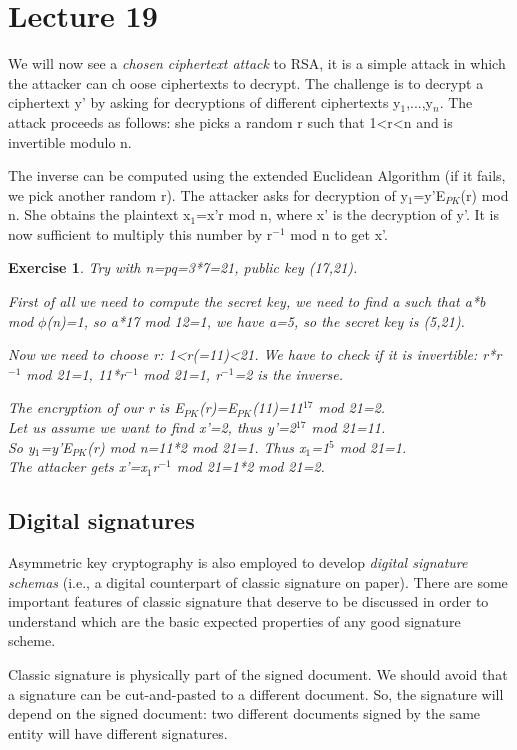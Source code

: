 \documentclass[a4paper, 12pt]{report}
\newtheorem{exercise}{\textbf{Exercise}}
\begin{document}
\chapter*{Lecture 19}
We will now see a \textit{chosen ciphertext attack} to RSA, it is a simple attack in which the attacker can ch	oose ciphertexts to decrypt. The challenge is to decrypt a ciphertext y' by asking for decryptions of different ciphertexts y$_1$,...,y$_n$. The attack proceeds as follows: she picks a random r such that 1<r<n and is invertible modulo n.

The inverse can be computed using the extended Euclidean Algorithm (if it fails, we pick another random r). The attacker asks for decryption of y$_1$=y'E$_{PK}$(r) mod n. She obtains the plaintext x$_1$=x'r mod n, where x' is the decryption of y'. It is now sufficient to multiply this number by r$^{-1}$ mod n to get x'.

\begin{exercise}
	Try with n=pq=3*7=21, public key (17,21).
	
	First of all we need to compute the secret key, we need to find a such that a*b mod $\phi$(n)=1, so a*17 mod 12=1, we have a=5, so the secret key is (5,21).
	
	Now we need to choose r: 1<r(=11)<21. We have to check if it is invertible: r*r$^{-1}$ mod 21=1, 11*r$^{-1}$ mod 21=1, r$^{-1}$=2 is the inverse.
	
	The encryption of our r is E$_{PK}$(r)=E$_{PK}$(11)=11$^{17}$ mod 21=2.\\
	Let us assume we want to find x'=2, thus y'=2$^{17}$ mod 21=11.\\
	So y$_1$=y'E$_{PK}$(r) mod n=11*2 mod 21=1. Thus x$_1$=1$^5$ mod 21=1.\\
	The attacker gets x'=x$_1$r$^{-1}$ mod 21=1*2 mod 21=2.
\end{exercise}

\section*{Digital signatures}
Asymmetric key cryptography is also employed to develop \textit{digital signature schemas} (i.e., a digital counterpart of classic signature on paper). There are some important features of classic signature that deserve to be discussed in order to understand which are the basic expected properties of any good signature scheme.

Classic signature is physically part of the signed document. We should avoid that a signature can be cut-and-pasted to a different document. So, the signature will depend on the signed document: two different documents signed by the same entity will have different signatures.
\end{document}
